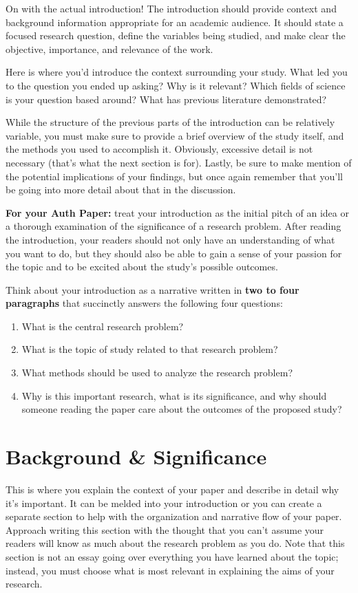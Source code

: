 \documentclass[10pt,twocolumn,letterpaper]{article}
\begin{document}
On with the actual introduction! The introduction should provide context and background information appropriate for an academic audience. It should state a focused research question, define the variables being studied, and make clear the objective, importance, and relevance of the work.

Here is where you'd introduce the context surrounding your study. What led you to the question you ended up asking? Why is it relevant? Which fields of science is your question based around? What has previous literature demonstrated?

While the structure of the previous parts of the introduction can be relatively variable, you must make sure to provide a brief overview of the study itself, and the methods you used to accomplish it. Obviously, excessive detail is not necessary (that's what the next section is for). Lastly, be sure to make mention of the potential implications of your findings, but once again remember that you'll be going into more detail about that in the discussion.

\textbf{For your Auth Paper:} treat your introduction as the initial pitch of an idea or a thorough examination of the significance of a research problem. After reading the introduction, your readers should not only have an understanding of what you want to do, but they should also be able to gain a sense of your passion for the topic and to be excited about the study's possible outcomes.

Think about your introduction as a narrative written in \textbf{two to four paragraphs} that succinctly answers the following four questions:
\begin{enumerate}
   \item What is the central research problem?
   \item What is the topic of study related to that research problem?
    \item What methods should be used to analyze the research problem?
   \item Why is this important research, what is its significance, and why should someone reading the paper care about the outcomes of the proposed study?
\end{enumerate}

\section{Background \& Significance}
This is where you explain the context of your paper and describe in detail why it's important. It can be melded into your introduction or you can create a separate section to help with the organization and narrative flow of your paper. Approach writing this section with the thought that you can’t assume your readers will know as much about the research problem as you do. Note that this section is not an essay going over everything you have learned about the topic; instead, you must choose what is most relevant in explaining the aims of your research.
\end{document}
